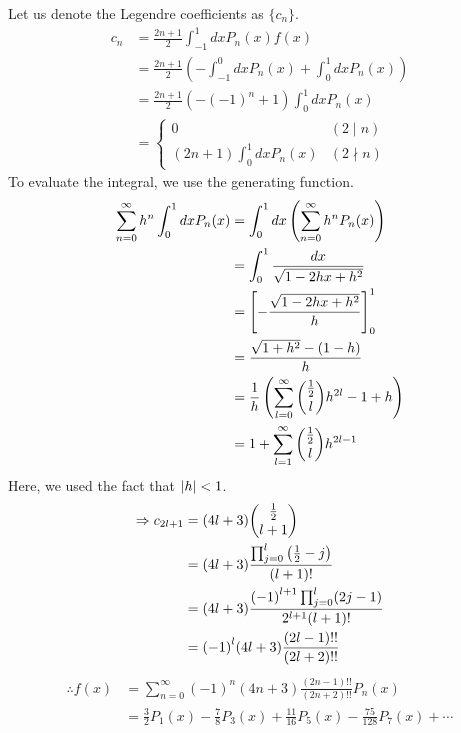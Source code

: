 \item

Let us denote the Legendre coefficients as $\{c_n\}$.
\begin{align*}
    c_n
    &= \frac{2n + 1}{2} \int_{-1}^1 dx P_n (x) f(x) \\
    &= \frac{2n + 1}{2} \left(
        - \int_{-1}^0 dx P_n (x)
        + \int_0   ^1 dx P_n (x)
    \right) \\
    &= \frac{2n + 1}{2} \left(
        -{(-1)}^n + 1
    \right) \int_0^1 dx P_n(x) \\
    &= \begin{cases}
        0                           & (2 \mid  n) \\
        (2n + 1) \int_0^1 dx P_n(x) & (2 \nmid n)
    \end{cases}
\end{align*}
To evaluate the integral, we use the generating function.
\begin{align*}
    \sum_{n = 0}^\infty h^n \int_0^1 dx P_n(x)
    &= \int_0^1 dx \left(
        \sum_{n=0}^\infty h^n P_n(x)
    \right) \\
    &= \int_0^1 \frac{dx}{
        \sqrt{1 - 2hx + h^2}
    } \\
    &= {\left[ -\frac{\sqrt{1 - 2hx + h^2}}{h} \right]_{0}^{1}} \\
    &= \frac{\sqrt{1 + h^2} - (1 - h)}{h} \\
    &= \frac{1}{h} \left(
        \sum_{l=0}^\infty \binom{\frac{1}{2}}{l}h^{2l} - 1 + h
    \right) \\
    &= 1 + \sum_{l = 1}^\infty \binom{\frac{1}{2}}{l} h^{2l - 1}
\end{align*}
Here, we used the fact that $\left| h \right| < 1$.
\begin{align*}
    \Rightarrow c_{2l + 1}
    &= (4l + 3) \binom{\frac{1}{2}}{l + 1} \\
    &= (4l + 3) \frac{
        \prod_{j=0}^l \left( \frac{1}{2} - j \right)
    }{(l + 1)!} \\
    &= (4l + 3) \frac{
        {(-1)}^{l + 1} \prod_{j=0}^l (2j - 1)
    }{2^{l + 1} (l+1)!} \\
    &= {(-1)}^l (4l + 3) \frac{(2l - 1)!!}{(2l + 2)!!}
\end{align*}
\begin{align*}
    \therefore f(x)
    &= \sum_{n=0}^\infty {(-1)}^n (4n + 3) \frac{(2n - 1)!!}{(2n + 2)!!} P_n(x) \\
    &= \frac{3}{2}    P_1(x)
     - \frac{7}{8}    P_3(x)
     + \frac{11}{16}  P_5(x)
     - \frac{75}{128} P_7(x)
     + \cdots
\end{align*}
